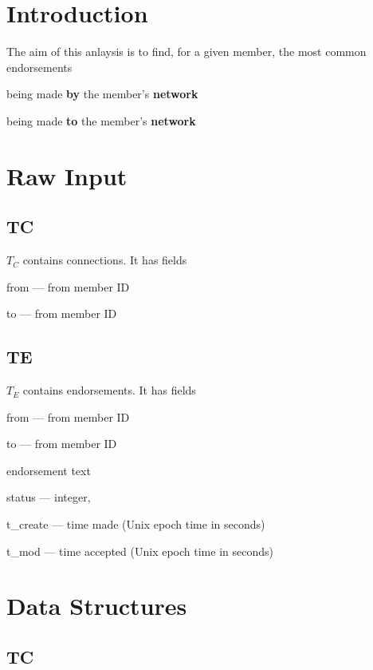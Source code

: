 \usepackage{hyperref}

\section{Introduction}

The aim of this anlaysis is to find, for a given member, 
the most common endorsements 
\be
\item being made {\bf by} the member's {\bf network}
\item being made {\bf to} the member's {\bf network}
\ee

\section{Raw Input}

\subsection{TC}
\label{TC}

\(T_C\) contains connections. It has fields
\be
\item from --- from member ID 
\item   to --- from member ID 
\ee

\subsection{TE}
\label{T_E}

\(T_E\) contains endorsements. It has fields
\be
\item from --- from member ID 
\item   to --- from member ID 
\item endorsement text
\item status --- integer, \TBC
\item t\_create --- time made (Unix epoch time in seconds)
\item t\_mod --- time accepted (Unix epoch time in seconds)
\ee


\section{Data Structures}

\subsection{TC}
\label{TC_plp}


